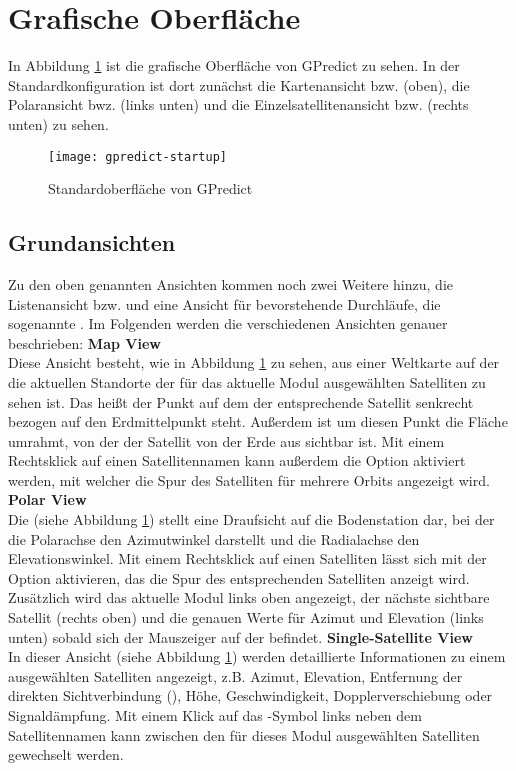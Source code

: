 \section{Grafische Oberfläche}

In Abbildung \ref{fig:gpredictstartup} ist die grafische Oberfläche von GPredict zu sehen. In der Standardkonfiguration ist dort zunächst die Kartenansicht bzw.  (oben), die Polaransicht bwz.  (links unten) und die Einzelsatellitenansicht bzw.  (rechts unten) zu sehen.

\begin{figure}[h]
	\centering
	\texttt{[image: gpredict-startup]}
	\caption{Standardoberfläche von GPredict}
	\label{fig:gpredictstartup} 
\end{figure}

\clearpage

\subsection{Grundansichten}

Zu den oben genannten Ansichten kommen noch zwei Weitere hinzu, die Listenansicht bzw.  und eine Ansicht für bevorstehende Durchläufe, die sogenannte . Im Folgenden werden die verschiedenen Ansichten genauer beschrieben:\newpar
\textbf{Map View}\\
Diese Ansicht besteht, wie in Abbildung \ref{fig:gpredictstartup} zu sehen, aus einer Weltkarte auf der die aktuellen Standorte der für das aktuelle Modul ausgewählten Satelliten zu sehen ist. Das heißt der Punkt auf dem der entsprechende Satellit senkrecht bezogen auf den Erdmittelpunkt steht. Außerdem ist um diesen Punkt die Fläche umrahmt, von der der Satellit von der Erde aus sichtbar ist. Mit einem Rechtsklick auf einen Satellitennamen kann außerdem die Option  aktiviert werden, mit welcher die Spur des Satelliten für mehrere Orbits angezeigt wird.\newpar
\textbf{Polar View}\\
Die  (siehe Abbildung \ref{fig:gpredictstartup}) stellt eine Draufsicht auf die Bodenstation dar, bei der die Polarachse den Azimutwinkel darstellt und die Radialachse den Elevationswinkel. Mit einem Rechtsklick auf einen Satelliten lässt sich mit der Option  aktivieren, das die Spur des entsprechenden Satelliten anzeigt wird. Zusätzlich wird das aktuelle Modul links oben angezeigt, der nächste sichtbare Satellit (rechts oben) und die genauen Werte für Azimut und Elevation (links unten) sobald sich der Mauszeiger auf der  befindet.\newpar
\textbf{Single-Satellite View}\\
In dieser Ansicht (siehe Abbildung \ref{fig:gpredictstartup}) werden detaillierte Informationen zu einem ausgewählten Satelliten angezeigt, z.B. Azimut, Elevation, Entfernung der direkten Sichtverbindung (), Höhe, Geschwindigkeit, Dopplerverschiebung oder Signaldämpfung. Mit einem Klick auf das \myvsymbol-Symbol links neben dem Satellitennamen kann zwischen den für dieses Modul ausgewählten Satelliten gewechselt werden.

